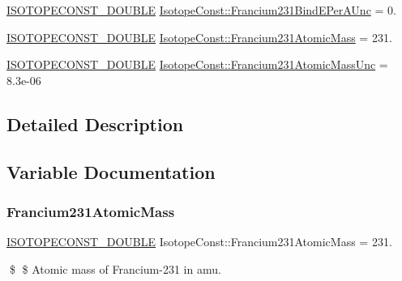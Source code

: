 \begin{DoxyCompactItemize}
\mbox{\hyperlink{group___isotope_const-_macros_ga8f45a7272ce02c0b4c65c44636ed719a}{I\+S\+O\+T\+O\+P\+E\+C\+O\+N\+S\+T\+\_\+\+D\+O\+U\+B\+LE}} \mbox{\hyperlink{group___isotope_const-_francium-_fr231_gaf07ebb822318f37e49f9e1ac2d400c20}{Isotope\+Const\+::\+Francium231\+Bind\+E\+Per\+A\+Unc}} = 0.
\item 
\mbox{\hyperlink{group___isotope_const-_macros_ga8f45a7272ce02c0b4c65c44636ed719a}{I\+S\+O\+T\+O\+P\+E\+C\+O\+N\+S\+T\+\_\+\+D\+O\+U\+B\+LE}} \mbox{\hyperlink{group___isotope_const-_francium-_fr231_ga4b618bfc567f045e117ffcc6a2d81c83}{Isotope\+Const\+::\+Francium231\+Atomic\+Mass}} = 231.
\item 
\mbox{\hyperlink{group___isotope_const-_macros_ga8f45a7272ce02c0b4c65c44636ed719a}{I\+S\+O\+T\+O\+P\+E\+C\+O\+N\+S\+T\+\_\+\+D\+O\+U\+B\+LE}} \mbox{\hyperlink{group___isotope_const-_francium-_fr231_gaf84eeabdb9aed022d392886e1859fcb7}{Isotope\+Const\+::\+Francium231\+Atomic\+Mass\+Unc}} = 8.\+3e-\/06
\end{DoxyCompactItemize}


\subsection{Detailed Description}


\subsection{Variable Documentation}
\mbox{\label{group___isotope_const-_francium-_fr231_ga4b618bfc567f045e117ffcc6a2d81c83}} 
\subsubsection{\texorpdfstring{Francium231\+Atomic\+Mass}{Francium231AtomicMass}}
{\footnotesize\ttfamily \mbox{\hyperlink{group___isotope_const-_macros_ga8f45a7272ce02c0b4c65c44636ed719a}{I\+S\+O\+T\+O\+P\+E\+C\+O\+N\+S\+T\+\_\+\+D\+O\+U\+B\+LE}} Isotope\+Const\+::\+Francium231\+Atomic\+Mass = 231.}

\$ \$ Atomic mass of Francium-\/231 in amu. \mbox{\label{group___isotope_const-_francium-_fr231_gaf84eeabdb9aed022d392886e1859fcb7}} 
